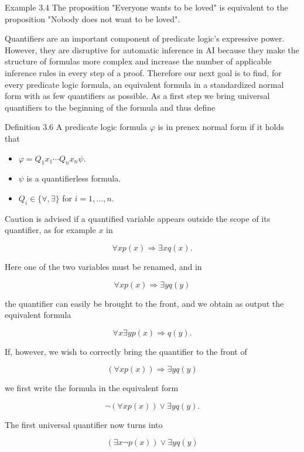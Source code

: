 \documentclass[10pt]{book}
\begin{document}
Example 3.4 The proposition "Everyone wants to be loved" is equivalent to the proposition "Nobody does not want to be loved".

Quantifiers are an important component of predicate logic's expressive power. However, they are disruptive for automatic inference in AI because they make the structure of formulas more complex and increase the number of applicable inference rules in every step of a proof. Therefore our next goal is to find, for every predicate logic formula, an equivalent formula in a standardized normal form with as few quantifiers as possible. As a first step we bring universal quantifiers to the beginning of the formula and thus define

Definition 3.6 A predicate logic formula $\varphi$ is in prenex normal form if it holds that

\begin{itemize}
  \item $\varphi=Q_{1} x_{1} \cdots Q_{n} x_{n} \psi$.
  \item $\psi$ is a quantifierless formula.
  \item $Q_{i} \in\{\forall, \exists\}$ for $i=1, \ldots, n$.
\end{itemize}

Caution is advised if a quantified variable appears outside the scope of its quantifier, as for example $x$ in

$$
\forall x p(x) \Rightarrow \exists x q(x) .
$$

Here one of the two variables must be renamed, and in

$$
\forall x p(x) \Rightarrow \exists y q(y)
$$

the quantifier can easily be brought to the front, and we obtain as output the equivalent formula

$$
\forall x \exists y p(x) \Rightarrow q(y) .
$$

If, however, we wish to correctly bring the quantifier to the front of


\begin{equation*}
(\forall x p(x)) \Rightarrow \exists y q(y) \tag{3.4}
\end{equation*}


we first write the formula in the equivalent form

$$
\neg(\forall x p(x)) \vee \exists y q(y) .
$$

The first universal quantifier now turns into


$$
(\exists x \neg p(x)) \vee \exists y q(y)
$$
\end{document}
